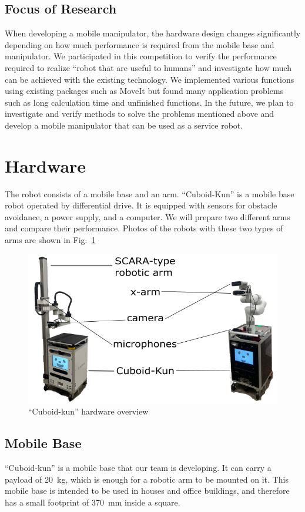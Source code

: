 \documentclass[runningheads,a4paper]{llncs}
\begin{document}
\subsection{Focus of Research}
When developing a mobile manipulator, the hardware design changes significantly depending on how much performance is required from the mobile base and manipulator. We participated in this competition to verify the performance required to realize ``robot that are useful to humans'' and investigate how much can be achieved with the existing technology. We implemented various functions using existing packages such as MoveIt but found many application problems such as long calculation time and unfinished functions. In the future, we plan to investigate and verify methods to solve the problems mentioned above and develop a mobile manipulator that can be used as a service robot.

\section{Hardware}
The robot consists of a mobile base and an arm.
``Cuboid-Kun'' is a mobile base robot operated by differential drive. It is equipped with sensors for obstacle avoidance, a power supply, and a computer.
We will prepare two different arms and compare their performance.
Photos of the robots with these two types of arms are shown in Fig.~\ref{fig:hardware}
\begin{figure}[tbp]
    \centering
    \includegraphics[width=0.5\linewidth]{images/Hardware.png}
    \caption{``Cuboid-kun'' hardware overview}
    \label{fig:hardware}
\end{figure}

\subsection{Mobile Base}
``Cuboid-kun'' is a mobile base that our team is developing.
It can carry a payload of 20~kg, which is enough for a robotic arm to be mounted on it.
This mobile base is intended to be used in houses and office buildings, and therefore has a small footprint of 370~mm inside a square.
\end{document}
